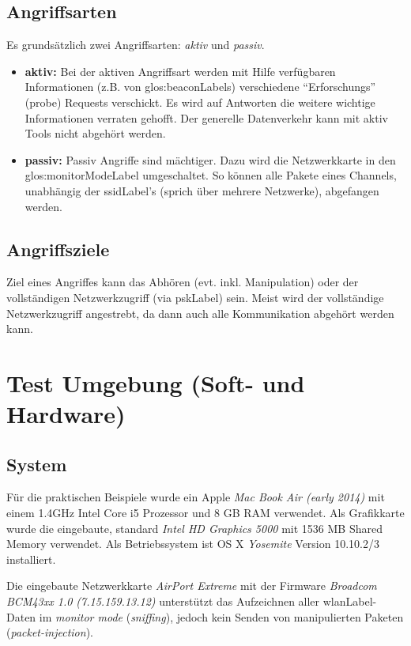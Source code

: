 \subsection{Angriffsarten}
Es grundsätzlich zwei Angriffsarten: \textit{aktiv} und \textit{passiv}.
\begin{itemize}
	\item \textbf{aktiv:}
	Bei der aktiven Angriffsart werden mit Hilfe verfügbaren Informationen (z.B. von \glspl{glos:beaconLabel}) verschiedene "`Erforschungs"' (probe) Requests verschickt.
	Es wird auf Antworten die weitere wichtige Informationen verraten gehofft.
	Der generelle Datenverkehr kann mit aktiv Tools nicht abgehört werden.

	\item \textbf{passiv:}
	Passiv Angriffe sind mächtiger. Dazu wird die Netzwerkkarte in den \gls{glos:monitorModeLabel} umgeschaltet.
	So können alle Pakete eines Channels, unabhängig der \gls{ssidLabel}'s (sprich über mehrere Netzwerke), abgefangen werden.

\end{itemize}

\subsection{Angriffsziele}
Ziel eines Angriffes kann das Abhören (evt. inkl. Manipulation) oder der vollständigen Netzwerkzugriff (via \gls{pskLabel}) sein.
Meist wird der vollständige Netzwerkzugriff angestrebt, da dann auch alle Kommunikation abgehört werden kann.

\section{Test Umgebung (Soft- und Hardware)}
\label{sec:testEnvroiment}
\subsection{System}
Für die praktischen Beispiele wurde ein Apple \textit{Mac Book Air (early 2014)} mit einem 1.4GHz Intel Core i5 Prozessor und 8 GB RAM verwendet. Als Grafikkarte wurde die eingebaute, standard \textit{Intel HD Graphics 5000} mit 1536 MB Shared Memory verwendet.
Als Betriebssystem ist OS X \textit{Yosemite} Version 10.10.2/3  installiert.

Die eingebaute Netzwerkkarte \textit{AirPort Extreme} mit der Firmware \textit{Broadcom BCM43xx 1.0 (7.15.159.13.12)} unterstützt das Aufzeichnen aller \gls{wlanLabel}-Daten im \textit{monitor mode} (\textit{sniffing}), jedoch kein Senden von manipulierten Paketen (\textit{packet-injection}).

